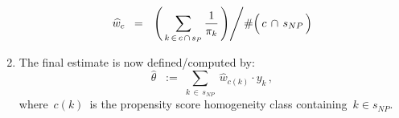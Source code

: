 \begin{enumerate}
	\begin{equation*}
	\widehat{w}_{c}
	\;\; = \;\;
		\left. \left(\,\underset{k\,\in\,c\,\cap\,s_{P}}{\sum}\,\dfrac{1}{\pi_{k}}\,\right) \right\slash
		\!\#\!\left(\,c\,\overset{{\color{white}.}}{\cap}\,s_{NP}\,\right)
	\end{equation*}
\item
	The final estimate is now defined/computed by:
	\begin{equation*}
	\widehat{\theta}
	\;\; := \;
		\underset{k\,\in\,s_{NP}}{\sum}\;
		\widehat{w}_{c(k)} \cdot y_{k}\,,
	\end{equation*}
	where \,$c(k)$\, is the propensity score homogeneity class containing \,$k \in s_{NP}$.
\end{enumerate}


\renewcommand{\theenumi}{\roman{enumi}}
\renewcommand{\labelenumi}{\textnormal{(\theenumi)}$\;\;$}

